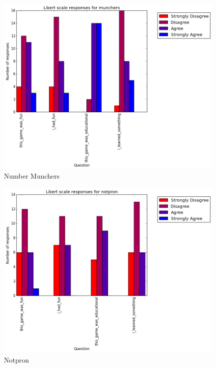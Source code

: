 			\begin{figure}[] 
			\centering 
			\includegraphics[width=\textwidth]{munchers_likert.png} 
			\caption{Number Munchers}
			\end{figure}

			\begin{figure}[] 
			\centering 
			\includegraphics[width=\textwidth]{notpron_likert.png} 
			\caption{Notpron}
			\end{figure}

